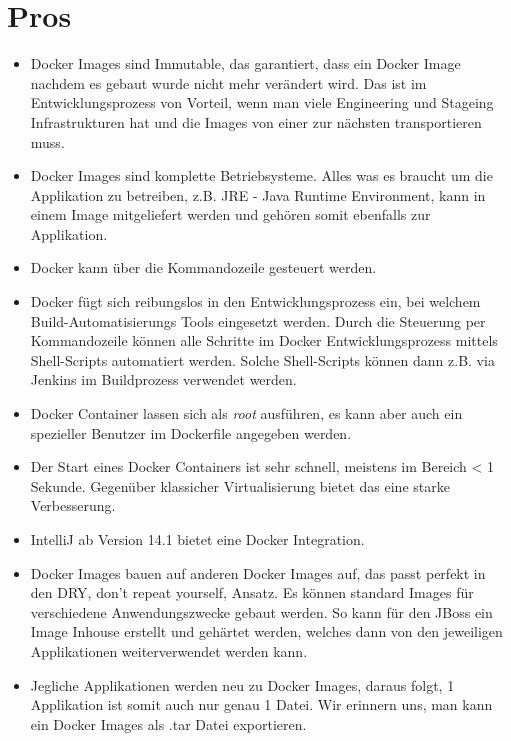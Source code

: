 \section{Pros}

\begin{itemize}

\item Docker Images sind Immutable, das garantiert, dass ein Docker Image nachdem es gebaut wurde
nicht mehr verändert wird. Das ist im Entwicklungsprozess von Vorteil, wenn man viele Engineering und
Stageing Infrastrukturen hat und die Images von einer zur nächsten transportieren muss.

\item Docker Images sind komplette Betriebsysteme. Alles was es braucht um die Applikation
zu betreiben, z.B. JRE - Java Runtime Environment, kann in einem Image mitgeliefert werden
und gehören somit ebenfalls zur Applikation.

\item Docker kann über die Kommandozeile gesteuert werden.

\item Docker fügt sich reibungslos in den Entwicklungsprozess ein, bei welchem Build-Automatisierungs
Tools eingesetzt werden. Durch die Steuerung per Kommandozeile können alle Schritte im Docker
Entwicklungsprozess mittels Shell-Scripts automatiert werden. Solche Shell-Scripts können dann z.B.
via Jenkins im Buildprozess verwendet werden.

\item Docker Container lassen sich als \textit{root} ausführen, es kann aber auch ein spezieller
Benutzer im Dockerfile angegeben werden.

\item Der Start eines Docker Containers ist sehr schnell, meistens im Bereich < 1 Sekunde.
Gegenüber klassicher Virtualisierung bietet das eine starke Verbesserung.

\item IntelliJ ab Version 14.1 bietet eine Docker Integration.

\item Docker Images bauen auf anderen Docker Images auf, das passt perfekt in den DRY, don't repeat
yourself, Ansatz. Es können standard Images für verschiedene Anwendungszwecke gebaut werden. So kann
für den JBoss ein Image Inhouse erstellt und gehärtet werden, welches dann von den jeweiligen
Applikationen weiterverwendet werden kann.

\item Jegliche Applikationen werden neu zu Docker Images, daraus folgt, 1 Applikation ist somit auch nur genau
1 Datei. Wir erinnern uns, man kann ein Docker Images als .tar Datei exportieren.

\end{itemize}

